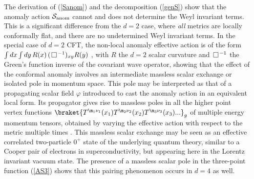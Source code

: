 \documentclass[a4paper,11pt,openright,twoside]{book}
\let\n=\nu      \let\x=\xi     \let\p=\pi      \let\r=\rho
\def\nbox#1#2{\vcenter{\hrule \hbox{\vrule height#2in
			\kern#1in \vrule} \hrule}}
\def\sq{\,\raise.5pt\hbox{$\nbox{.09}{.09}$}\,}
\numberwithin{equation}{section}
\begin{document}
{{The derivation of (\ref{Sanom}) and the decomposition (\ref{genS}) show that the anomaly action $\mathcal{S}_{\rm anom}$ cannot
and does not determine the Weyl invariant terms. This is a significant difference from the $d=2$ case, where {\it all} metrics are
locally conformally flat, and there are no undetermined Weyl invariant terms. In the special case of $d=2$ CFT, the non-local anomaly 
effective action is of the form $\int dx \int dy\, R(x)\,(\sq^{-1})_{xy} R(y)$ \cite{Polyakov:1981}, with $R$ the $d=2$ scalar curvature and $\sq^{-1}$ the Green's function inverse of the covariant wave operator, showing that the effect of the conformal anomaly involves an intermediate massless scalar exchange or isolated pole in momentum space. This pole may be interpreted as that of a propagating scalar field $\varphi$ introduced to cast the anomaly action in an equivalent local form. Its propagator gives rise to massless poles in all the higher point vertex functions 
$\braket{ T^{\m_1\n_1}(x_1) T^{\m_2\n_2}(x_2)T^{\m_3\n_3}(x_3)...}_g$  of multiple energy momentum tensors, obtained by varying the effective action 
with respect to the metric multiple times \cite{Blaschke:2014ioa}. This massless scalar exchange may be seen as an effective correlated two-particle 
$0^+$ state of the underlying quantum theory, similar to a Cooper pair of electrons in superconductivity, but appearing here in the Lorentz invariant vacuum state. The presence of a massless scalar pole in the three-point function (\ref{AS3}) shows that this pairing phenomenon occurs in $d=4$ as well.

}}
\end{document}

